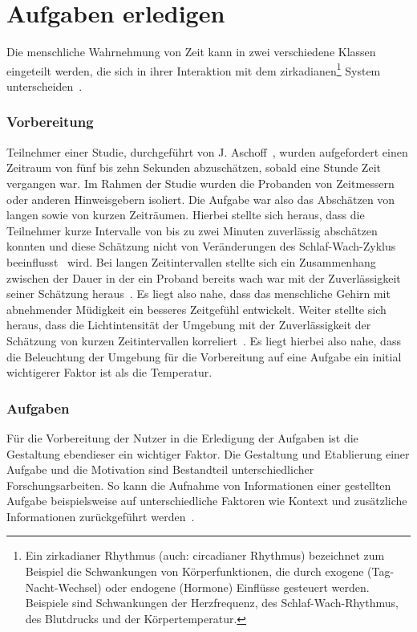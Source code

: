 \section{Aufgaben erledigen}\label{sec:relatedWork.aufgaben}

Die menschliche Wahrnehmung von Zeit kann in zwei verschiedene Klassen eingeteilt werden, die sich in ihrer Interaktion mit dem zirkadianen\footnote{Ein zirkadianer Rhythmus (auch: circadianer Rhythmus) bezeichnet zum Beispiel die Schwankungen von Körperfunktionen, die durch exogene (Tag-Nacht-Wechsel) oder endogene (Hormone) Einflüsse gesteuert werden. Beispiele sind Schwankungen der Herzfrequenz, des Schlaf-Wach-Rhythmus, des Blutdrucks und der Körpertemperatur.} System unterscheiden~\cite{aschoff1998human, aschoff1985perception}.

\subsubsection{Vorbereitung}

Teilnehmer einer Studie, durchgeführt von J. Aschoff~\cite{aschoff1998human}, wurden aufgefordert einen Zeitraum von fünf bis zehn Sekunden abzuschätzen, sobald eine Stunde Zeit vergangen war. Im Rahmen der Studie wurden die Probanden von Zeitmessern oder anderen Hinweisgebern isoliert.
Die Aufgabe war also das Abschätzen von langen sowie von kurzen Zeiträumen. 
Hierbei stellte sich heraus, dass die Teilnehmer kurze Intervalle von bis zu zwei Minuten zuverlässig abschätzen konnten und diese Schätzung nicht von Veränderungen des Schlaf-Wach-Zyklus beeinflusst~\cite{aschoff1998human} wird. 
Bei langen Zeitintervallen stellte sich ein Zusammenhang zwischen der Dauer in der ein Proband bereits wach war mit der Zuverlässigkeit seiner Schätzung heraus~\cite{aschoff1998human}. 
Es liegt also nahe, dass das menschliche Gehirn mit abnehmender Müdigkeit ein besseres Zeitgefühl entwickelt.
Weiter stellte sich heraus, dass die Lichtintensität der Umgebung mit der Zuverlässigkeit der Schätzung von kurzen Zeitintervallen korreliert~\cite{aschoff1998human}.
Es liegt hierbei also nahe, dass die Beleuchtung der Umgebung für die Vorbereitung auf eine Aufgabe ein initial wichtigerer Faktor ist als die Temperatur. 

\subsubsection{Aufgaben}

Für die Vorbereitung der Nutzer in die Erledigung der Aufgaben ist die Gestaltung ebendieser ein wichtiger Faktor. Die Gestaltung und Etablierung einer Aufgabe und die Motivation sind Bestandteil unterschiedlicher Forschungsarbeiten. 
So kann die Aufnahme von Informationen einer gestellten Aufgabe beispielsweise auf unterschiedliche Faktoren wie Kontext und zusätzliche Informationen zurückgeführt werden~\cite{salancik1978social, van2002blueprints, hollnagel2003handbook}. 

